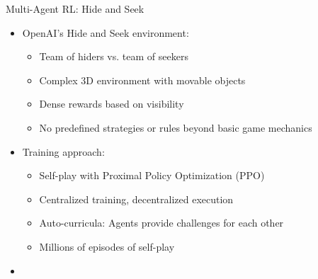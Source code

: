\documentclass[10pt]{beamer}
\begin{document}
\begin{frame}{Multi-Agent RL: Hide and Seek}
    \begin{itemize}
        \item OpenAI's Hide and Seek environment:
        \begin{itemize}
            \item Team of hiders vs. team of seekers
            \item Complex 3D environment with movable objects
            \item Dense rewards based on visibility
            \item No predefined strategies or rules beyond basic game mechanics
        \end{itemize}
        \vspace{0.2cm}
        \item Training approach:
        \begin{itemize}
            \item Self-play with Proximal Policy Optimization (PPO)
            \item Centralized training, decentralized execution
            \item Auto-curricula: Agents provide challenges for each other
            \item Millions of episodes of self-play
        \end{itemize}
        \vspace{0.2cm}
        \item [YouTube Video Link: OpenAI Hide and Seek]
    \end{itemize}
\end{frame}
\end{document}
